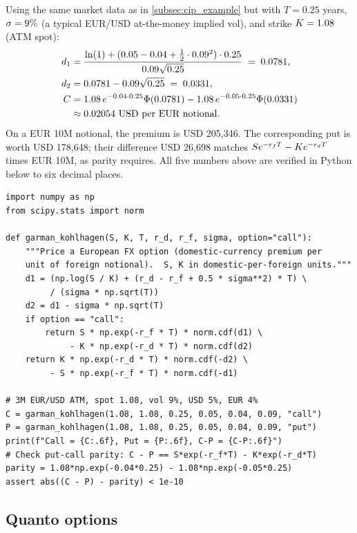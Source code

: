 Using the same market data as in \cref{subsec:cip_example} but with
$T = 0.25$ years, $\sigma = 9\%$ (a typical EUR/USD at-the-money
implied vol), and strike $K = 1.08$ (ATM spot):
\begin{align}
  d_1 &= \frac{\ln(1) + (0.05 - 0.04 + \tfrac12 \cdot 0.09^2) \cdot 0.25}
               {0.09 \sqrt{0.25}}
        \;=\; 0.0781, \\
  d_2 &= 0.0781 - 0.09\sqrt{0.25} \;=\; 0.0331, \\
  C &= 1.08\,e^{-0.04\cdot 0.25}\Phi(0.0781)
           - 1.08\,e^{-0.05\cdot 0.25}\Phi(0.0331) \notag \\
        &\approx 0.02054 \text{ USD per EUR notional}.
\end{align}
On a EUR 10M notional, the premium is USD 205{,}346.
The corresponding put is worth USD 178{,}648; their difference
USD 26{,}698 matches $S e^{-r_f T} - K e^{-r_d T}$ times
EUR 10M, as parity requires.  All five numbers above are
verified in Python below to six decimal places.

\begin{lstlisting}[caption={Garman--Kohlhagen vanilla pricer for FX options.},label={lst:gk_pricer}]
import numpy as np
from scipy.stats import norm

def garman_kohlhagen(S, K, T, r_d, r_f, sigma, option="call"):
    """Price a European FX option (domestic-currency premium per
    unit of foreign notional).  S, K in domestic-per-foreign units."""
    d1 = (np.log(S / K) + (r_d - r_f + 0.5 * sigma**2) * T) \
         / (sigma * np.sqrt(T))
    d2 = d1 - sigma * np.sqrt(T)
    if option == "call":
        return S * np.exp(-r_f * T) * norm.cdf(d1) \
             - K * np.exp(-r_d * T) * norm.cdf(d2)
    return K * np.exp(-r_d * T) * norm.cdf(-d2) \
         - S * np.exp(-r_f * T) * norm.cdf(-d1)

# 3M EUR/USD ATM, spot 1.08, vol 9%, USD 5%, EUR 4%
C = garman_kohlhagen(1.08, 1.08, 0.25, 0.05, 0.04, 0.09, "call")
P = garman_kohlhagen(1.08, 1.08, 0.25, 0.05, 0.04, 0.09, "put")
print(f"Call = {C:.6f}, Put = {P:.6f}, C-P = {C-P:.6f}")
# Check put-call parity: C - P == S*exp(-r_f*T) - K*exp(-r_d*T)
parity = 1.08*np.exp(-0.04*0.25) - 1.08*np.exp(-0.05*0.25)
assert abs((C - P) - parity) < 1e-10
\end{lstlisting}

\subsection{Quanto options}

